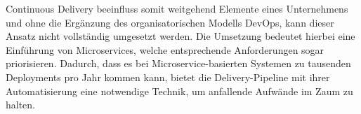 Continuous Delivery beeinfluss somit weitgehend Elemente eines Unternehmens und ohne die Ergänzung des organisatorischen Modells DevOps, kann dieser Ansatz nicht vollständig umgesetzt werden. Die Umsetzung bedeutet hierbei eine Einführung von Microservices, welche entsprechende Anforderungen sogar priorisieren. Dadurch, dass es bei Microservice-basierten Systemen zu tausenden Deployments pro Jahr kommen kann, bietet die Delivery-Pipeline mit ihrer Automatisierung eine notwendige Technik, um anfallende Aufwände im Zaum zu halten.


\ifCLASSOPTIONcaptionsoff
  \newpage
\fi